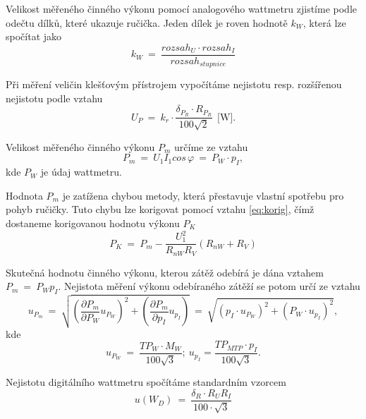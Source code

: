 \documentclass[a4paper,12pt]{article}   %
\begin{document}
Velikost měřeného činného výkonu pomocí analogového wattmetru zjistíme podle odečtu dílků, které ukazuje ručička. Jeden dílek je roven hodnotě $k_W$, která lze spočítat jako
\begin{equation*}
  k_W~=~\frac{rozsah_U \cdot rozsah_I}{rozsah_{stupnice}}
\end{equation*}

Při měření veličin klešťovým přístrojem vypočítáme nejistotu resp. rozšířenou nejistotu podle vztahu
\begin{equation*}
  U_P~=~k_r\cdot \frac{\delta_{P_R}\cdot R_{P_R}}{100\sqrt{2}}~~\textrm{[W]}.
\end{equation*}

Velikost měřeného činného výkonu $P_m$ určíme ze vztahu
\begin{equation*}
  P_m~=~U_1 I_1 cos\,\varphi~=~P_W \cdot p_I,
\end{equation*}
kde $P_W$ je údaj wattmetru.

Hodnota $P_m$ je zatížena chybou metody, která přestavuje vlastní spotřebu pro pohyb ručičky. Tuto chybu lze korigovat pomocí vztahu \ref{eq:korig}, čímž dostaneme korigovanou hodnotu výkonu $P_K$
\begin{equation}
  P_K~=~P_m - \frac{U_1^2}{R_{nW}R_V}(R_{nW} + R_V)
  \label{eq:korig}
\end{equation}

Skutečná hodnotu činného výkonu, kterou zátěž odebírá je dána vztahem $P_m~=~P_W p_I$. Nejistota měření výkonu odebíraného zátěží se potom určí ze vztahu
\begin{equation}
  u_{P_m}~=~\sqrt{\left(\frac{\partial P_m}{\partial P_W}u_{P_W}\right)^2 + \left(\frac{\partial P_m}{\partial p_I}u_{p_I}\right)}~=~\sqrt{(p_I \cdot u_{P_W})^2 + (P_W \cdot u_{p_I})^2},
  \label{eq:analognejistota}
\end{equation}
kde
\begin{equation}
  u_{P_W}~=~\frac{TP_W\cdot M_W}{100\sqrt{3}};~u_{p_I}=\frac{TP_{MTP} \cdot p_I}{100\sqrt{3}}. 
\end{equation}


Nejistotu digitálního wattmetru spočítáme standardním vzorcem 
\begin{equation}
  u(W_D)~=~\frac{\delta_R\cdot R_U R_I}{100\cdot\sqrt{3}}
  \label{eq:diginejistota}
\end{equation}
\end{document}
